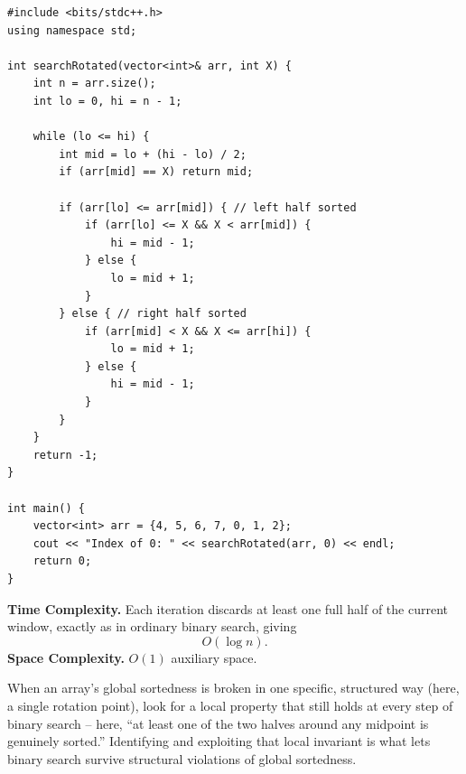 \begin{lstlisting}
#include <bits/stdc++.h>
using namespace std;

int searchRotated(vector<int>& arr, int X) {
    int n = arr.size();
    int lo = 0, hi = n - 1;

    while (lo <= hi) {
        int mid = lo + (hi - lo) / 2;
        if (arr[mid] == X) return mid;

        if (arr[lo] <= arr[mid]) { // left half sorted
            if (arr[lo] <= X && X < arr[mid]) {
                hi = mid - 1;
            } else {
                lo = mid + 1;
            }
        } else { // right half sorted
            if (arr[mid] < X && X <= arr[hi]) {
                lo = mid + 1;
            } else {
                hi = mid - 1;
            }
        }
    }
    return -1;
}

int main() {
    vector<int> arr = {4, 5, 6, 7, 0, 1, 2};
    cout << "Index of 0: " << searchRotated(arr, 0) << endl;
    return 0;
}
\end{lstlisting}

\begin{complexitybox}
\textbf{Time Complexity.} Each iteration discards at least one full half
of the current window, exactly as in ordinary binary search, giving
\[
  O(\log n).
\]
\textbf{Space Complexity.} $O(1)$ auxiliary space.
\end{complexitybox}

\begin{takeawaybox}
When an array's global sortedness is broken in one specific, structured way
(here, a single rotation point), look for a local property that still
holds at every step of binary search -- here, ``at least one of the two
halves around any midpoint is genuinely sorted.'' Identifying and exploiting
that local invariant is what lets binary search survive structural
violations of global sortedness.
\end{takeawaybox}
